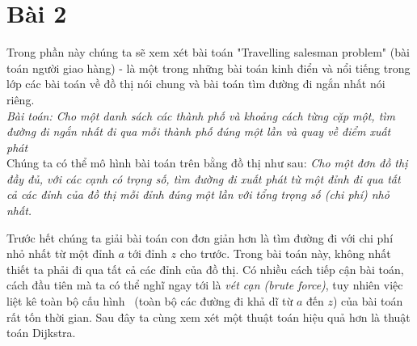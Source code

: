 
\section{Bài 2}
Trong phần này chúng ta sẽ xem xét bài toán "Travelling salesman problem" (bài toán 
người giao hàng) - là một trong những bài toán kinh điển và nổi tiếng trong lớp các
bài toán về đồ thị nói chung và bài toán tìm đường đi ngắn nhất nói riêng. \\

\textit{Bài toán: Cho một danh sách các thành phố và khoảng cách từng cặp một, 
tìm đường đi ngắn nhất đi qua mỗi thành phố đúng một lần và quay về điểm xuất phát} \\


Chúng ta có thể mô hình bài toán trên bằng đồ thị như sau: \textit{Cho một đơn đồ thị đầy đủ, 
với các cạnh có trọng số, tìm đường đi xuất phát từ một đỉnh đi qua tất cả các đỉnh 
của đồ thị mỗi đỉnh đúng một lần với tổng trọng số (chi phí) nhỏ nhất.}

Trước hết chúng ta giải bài toán con đơn giản hơn là tìm đường đi với chi phí nhỏ nhất từ
một đỉnh $a$ tới đỉnh $z$ cho trước. Trong bài toán này, không nhất thiết ta phải đi qua 
tất cả các đỉnh của đồ thị. Có nhiều cách tiếp cận bài toán, cách đầu tiên mà ta có thể nghĩ 
ngay tới là \textit{vét cạn (brute force)}, tuy nhiên việc liệt kê toàn bộ cấu hình \
(toàn bộ các đường đi khả dĩ từ $a$ đến $z$) của bài toán rất tốn thời gian. Sau đây ta cùng
xem xét một thuật toán hiệu quả hơn là thuật toán Dijkstra.



